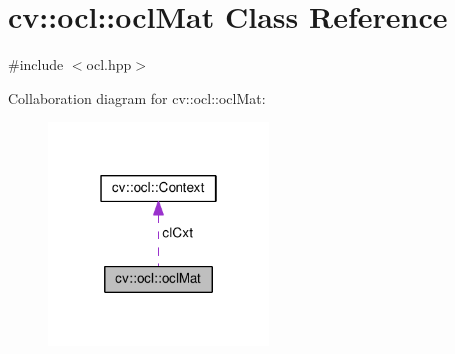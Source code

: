 \hypertarget{classcv_1_1ocl_1_1oclMat}{\section{cv\-:\-:ocl\-:\-:ocl\-Mat Class Reference}
\label{classcv_1_1ocl_1_1oclMat}
}


{\ttfamily \#include $<$ocl.\-hpp$>$}



Collaboration diagram for cv\-:\-:ocl\-:\-:ocl\-Mat\-:\nopagebreak
\begin{figure}[H]
\begin{center}
\leavevmode
\includegraphics[width=166pt]{classcv_1_1ocl_1_1oclMat__coll__graph}
\end{center}
\end{figure}
